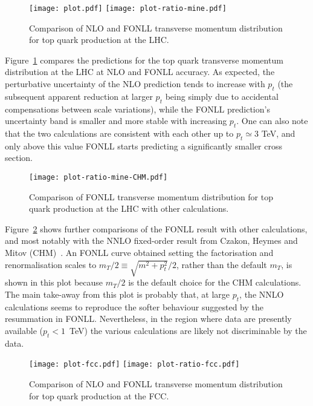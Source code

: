 \documentclass{PoS}
\begin{document}
\begin{figure}[t]
\texttt{[image: plot.pdf]}
\texttt{[image: plot-ratio-mine.pdf]}
\caption{\label{fig:lhc} Comparison of NLO and FONLL transverse momentum
distribution for top quark production at the LHC.}
\end{figure}

Figure~\ref{fig:lhc} compares the predictions for the top quark transverse
momentum distribution at the LHC at NLO and FONLL accuracy. As expected, the
perturbative 
uncertainty of the NLO prediction tends to increase with $p_t$ (the subsequent 
apparent reduction at larger $p_t$ being simply due to accidental compensations between
scale variations), while the FONLL prediction's uncertainty band is smaller and
more stable with increasing $p_t$. One can also note that the two calculations are
consistent with each other up to $p_t \simeq 3$ TeV, and only above this value
FONLL starts predicting a significantly smaller cross section.

\begin{figure}[t]
\center
\texttt{[image: plot-ratio-mine-CHM.pdf]}
\caption{\label{fig:comp} Comparison of FONLL transverse momentum
distribution for top quark production at the LHC with other calculations.}
\end{figure}

Figure~\ref{fig:comp} shows further comparisons of the FONLL result with other
calculations, and most notably with the NNLO fixed-order result from Czakon, 
Heymes and Mitov (CHM)~\cite{Czakon:2016dgf}.
An FONLL curve obtained setting the factorisation and renormalisation scales to
$m_T/2 \equiv \sqrt{m^2+p_t^2}/2$, rather than the default $m_T$, is shown in
this plot because $m_T/2$ is the default choice for the CHM calculations. The
main take-away from this plot is probably that, at large $p_t$, the NNLO
calculations seems to reproduce the softer behaviour suggested by the
resummation in FONLL. Nevertheless, in the region where data are presently
available ($p_t < 1$~TeV) the various calculations are likely not
discriminable by the data.

\begin{figure}[th]
\texttt{[image: plot-fcc.pdf]}
\texttt{[image: plot-ratio-fcc.pdf]}
\caption{\label{fig:fcc} Comparison of NLO and FONLL transverse momentum
distribution for top quark production at the FCC.}
\end{figure}
\end{document}
